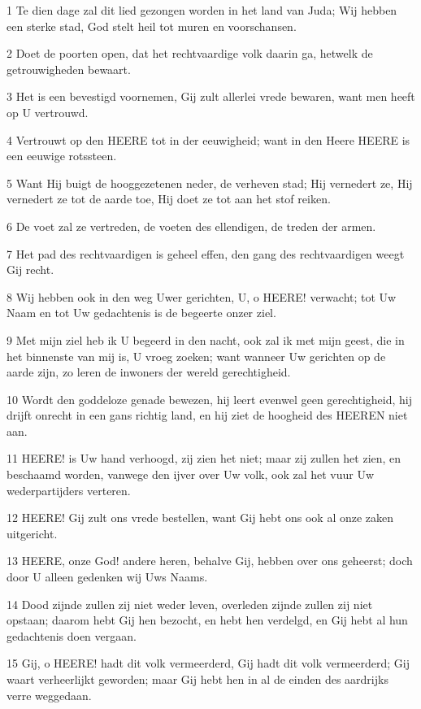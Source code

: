 \par 1 Te dien dage zal dit lied gezongen worden in het land van Juda; Wij hebben een sterke stad, God stelt heil tot muren en voorschansen.
\par 2 Doet de poorten open, dat het rechtvaardige volk daarin ga, hetwelk de getrouwigheden bewaart.
\par 3 Het is een bevestigd voornemen, Gij zult allerlei vrede bewaren, want men heeft op U vertrouwd.
\par 4 Vertrouwt op den HEERE tot in der eeuwigheid; want in den Heere HEERE is een eeuwige rotssteen.
\par 5 Want Hij buigt de hooggezetenen neder, de verheven stad; Hij vernedert ze, Hij vernedert ze tot de aarde toe, Hij doet ze tot aan het stof reiken.
\par 6 De voet zal ze vertreden, de voeten des ellendigen, de treden der armen.
\par 7 Het pad des rechtvaardigen is geheel effen, den gang des rechtvaardigen weegt Gij recht.
\par 8 Wij hebben ook in den weg Uwer gerichten, U, o HEERE! verwacht; tot Uw Naam en tot Uw gedachtenis is de begeerte onzer ziel.
\par 9 Met mijn ziel heb ik U begeerd in den nacht, ook zal ik met mijn geest, die in het binnenste van mij is, U vroeg zoeken; want wanneer Uw gerichten op de aarde zijn, zo leren de inwoners der wereld gerechtigheid.
\par 10 Wordt den goddeloze genade bewezen, hij leert evenwel geen gerechtigheid, hij drijft onrecht in een gans richtig land, en hij ziet de hoogheid des HEEREN niet aan.
\par 11 HEERE! is Uw hand verhoogd, zij zien het niet; maar zij zullen het zien, en beschaamd worden, vanwege den ijver over Uw volk, ook zal het vuur Uw wederpartijders verteren.
\par 12 HEERE! Gij zult ons vrede bestellen, want Gij hebt ons ook al onze zaken uitgericht.
\par 13 HEERE, onze God! andere heren, behalve Gij, hebben over ons geheerst; doch door U alleen gedenken wij Uws Naams.
\par 14 Dood zijnde zullen zij niet weder leven, overleden zijnde zullen zij niet opstaan; daarom hebt Gij hen bezocht, en hebt hen verdelgd, en Gij hebt al hun gedachtenis doen vergaan.
\par 15 Gij, o HEERE! hadt dit volk vermeerderd, Gij hadt dit volk vermeerderd; Gij waart verheerlijkt geworden; maar Gij hebt hen in al de einden des aardrijks verre weggedaan.
